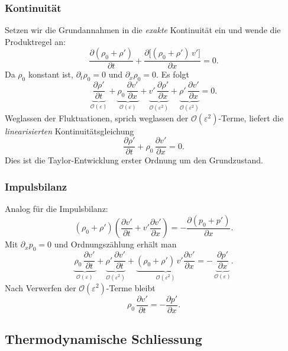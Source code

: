 \subsubsection*{Kontinuität}
Setzen wir die Grundannahmen in die \emph{exakte} Kontinuität ein und
wende die Produktregel an:
\[
    \frac{\partial(\rho_0+\rho')}{\partial t}
    +\frac{\partial\big[(\rho_0+\rho')\,v'\big]}{\partial x}=0.
\]
Da \(\rho_0\) konstant ist, \(\partial_t\rho_0=0\) und \(\partial_x\rho_0=0\).
Es folgt
\[
    \underbrace{\frac{\partial \rho'}{\partial t}}_{\mathcal{O}(\varepsilon)}
    +\underbrace{\rho_0\,\frac{\partial v'}{\partial x}}_{\mathcal{O}(\varepsilon)}
    +\underbrace{v'\,\frac{\partial \rho'}{\partial x}}_{\mathcal{O}(\varepsilon^2)}
    +\underbrace{\rho'\,\frac{\partial v'}{\partial x}}_{\mathcal{O}(\varepsilon^2)}=0.
\]
Weglassen der Fluktuationen, sprich weglassen der \(\mathcal{O}(\varepsilon^2)\)-Terme,
liefert die \emph{linearisierten} Kontinuitätsgleichung
\begin{equation}
    \frac{\partial \rho'}{\partial t}+\rho_0\,\frac{\partial v'}{\partial x}=0.
    \label{eq:lin-cont}
\end{equation}
Dies ist die Taylor-Entwicklung erster Ordnung um den Grundzustand.

\subsubsection*{Impulsbilanz}
Analog für die Impulsbilanz:
\[
    (\rho_0+\rho')\!\left(\frac{\partial v'}{\partial t}+v'\frac{\partial v'}{\partial x}\right)
    =-\frac{\partial (p_0+p')}{\partial x}.
\]
Mit \(\partial_x p_0=0\) und Ordnungszählung erhält man
\[
    \underbrace{\rho_0\,\frac{\partial v'}{\partial t}}_{\mathcal{O}(\varepsilon)}
    +\underbrace{\rho'\,\frac{\partial v'}{\partial t}}_{\mathcal{O}(\varepsilon^2)}
    +\underbrace{(\rho_0+\rho')\,v'\frac{\partial v'}{\partial x}}_{\mathcal{O}(\varepsilon^2)}
    =-\,\underbrace{\frac{\partial p'}{\partial x}}_{\mathcal{O}(\varepsilon)}.
\]
Nach Verwerfen der \(\mathcal{O}(\varepsilon^2)\)-Terme bleibt
\begin{equation}
    \rho_0\,\frac{\partial v'}{\partial t}=-\frac{\partial p'}{\partial x}.
    \label{eq:lin-mom}
\end{equation}

\subsection{Thermodynamische Schliessung}

